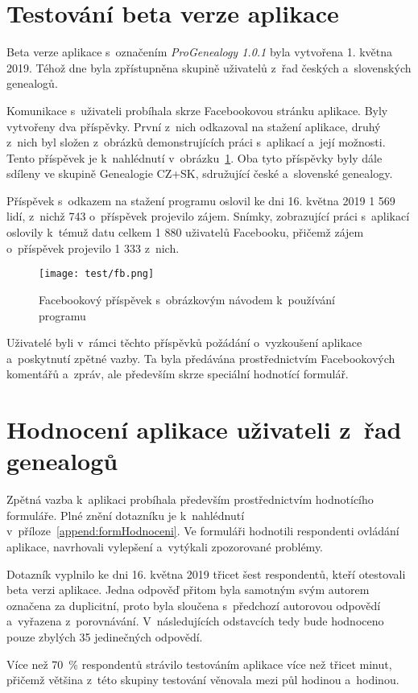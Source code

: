 	\section*{Testování beta verze aplikace}
	Beta verze aplikace s~označením \emph{ProGenealogy 1.0.1} byla vytvořena 1. května 2019. Téhož dne byla zpřístupněna skupině uživatelů z~řad českých a~slovenských genealogů.\par
	Komunikace s~uživateli probíhala skrze Facebookovou stránku aplikace. Byly vytvořeny dva příspěvky. První z~nich odkazoval na stažení aplikace, druhý z~nich byl složen z~obrázků demonstrujících práci s~aplikací a~její možnosti. Tento příspěvek je k~nahlédnutí v~obrázku~\ref{fig:fb}. Oba tyto příspěvky byly dále sdíleny ve skupině Genealogie CZ+SK, sdružující české a~slovenské genealogy.\par
	Příspěvek s~odkazem na stažení programu oslovil ke dni 16. května 2019 1 569 lidí, z~nichž 743 o~příspěvek projevilo zájem. Snímky, zobrazující práci s~aplikací oslovily k~témuž datu celkem 1 880 uživatelů Facebooku, přičemž zájem o~příspěvek projevilo 1 333 z~nich.\par
	\begin{figure}[h!]
		\centering
		\texttt{[image: test/fb.png]}
		\caption{Facebookový příspěvek s~obrázkovým návodem k~používání programu}
		\label{fig:fb}
	\end{figure}
	Uživatelé byli v~rámci těchto příspěvků požádání o~vyzkoušení aplikace a~poskytnutí zpětné vazby. Ta byla předávána prostřednictvím Facebookových komentářů a~zpráv, ale především skrze speciální hodnotící formulář.\par
	
	
	\section{Hodnocení aplikace uživateli z~řad genealogů}
	Zpětná vazba k~aplikaci probíhala především prostřednictvím hodnotícího formuláře. Plné znění dotazníku je k~nahlédnutí v~příloze~\ref{append:formHodnoceni}. Ve formuláři hodnotili respondenti ovládání aplikace, navrhovali vylepšení a~vytýkali zpozorované problémy.\par
	Dotazník vyplnilo ke dni 16. května 2019 třicet šest respondentů, kteří otestovali beta verzi aplikace. Jedna odpověď přitom byla samotným svým autorem označena za duplicitní, proto byla sloučena s~předchozí autorovou odpovědí a~vyřazena z~porovnávání. V~následujících odstavcích tedy bude hodnoceno pouze zbylých 35 jedinečných odpovědí.\par
	Více než 70~\% respondentů strávilo testováním aplikace více než třicet minut, přičemž většina z~této skupiny testování věnovala mezi půl hodinou a~hodinou.\par
	
